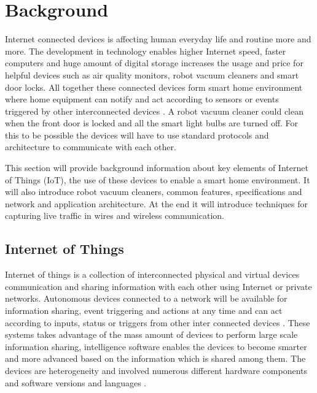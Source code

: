 \chapter{Background}

Internet connected devices is affecting human everyday life and routine more and more. The development in technology enables higher Internet speed, faster computers and huge amount of digital storage increases the usage and price for helpful devices such as air quality monitors, robot vacuum cleaners and smart door locks. All together these connected devices form smart home environment where home equipment can notify and act according to sensors or events triggered by other interconnected devices \cite{atlam2020iot}. A robot vacuum cleaner could clean when the front door is locked and all the smart light bulbs are turned off. For this to be possible the devices will have to use standard protocols and architecture to communicate with each other. 

This section will provide background information about key elements of Internet of Things (IoT), the use of these devices to enable a smart home environment. It will also introduce robot vacuum cleaners, common features, specifications and network and application architecture. At the end it will introduce techniques for capturing live traffic in wires and wireless communication. 

\section{Internet of Things}
Internet of things is a collection of interconnected physical and virtual devices communication and sharing information with each other using Internet or private networks. Autonomous devices connected to a network will be available for information sharing, event triggering and actions at any time and can act according to inputs, status or triggers from other inter connected devices \cite{atlam2020iot}. These systems takes advantage of the mass amount of devices to perform large scale information sharing, intelligence software enables the devices to become smarter and more advanced based on the information which is shared among them. The devices are heterogeneity and involved numerous different hardware components and software versions and languages \cite{atlam2020iot}.

